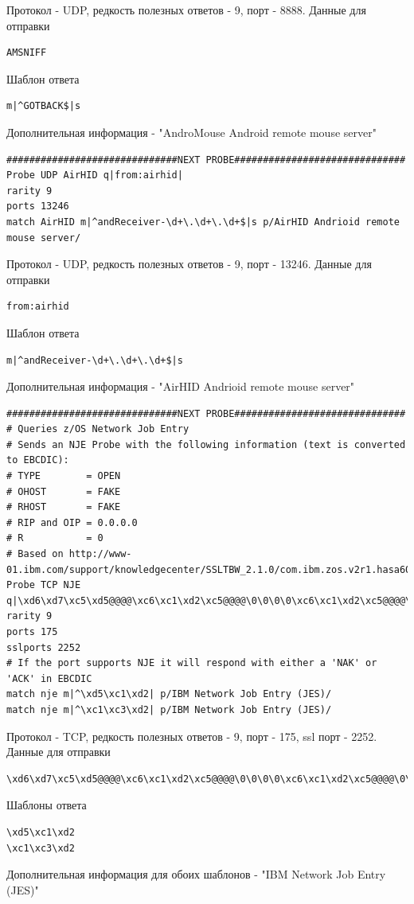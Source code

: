 \documentclass[10pt,a4paper]{report}
\begin{document}
Протокол - UDP, редкость полезных ответов - 9, порт - 8888.
Данные для отправки \begin{verbatim}AMSNIFF\end{verbatim}
Шаблон ответа \begin{verbatim}m|^GOTBACK$|s\end{verbatim}
Дополнительная информация - "AndroMouse Android remote mouse server"

\begin{verbatim}
##############################NEXT PROBE##############################
Probe UDP AirHID q|from:airhid|
rarity 9
ports 13246
match AirHID m|^andReceiver-\d+\.\d+\.\d+$|s p/AirHID Andrioid remote mouse server/
\end{verbatim}

Протокол - UDP, редкость полезных ответов - 9, порт - 13246.
Данные для отправки \begin{verbatim}from:airhid\end{verbatim}
Шаблон ответа \begin{verbatim}m|^andReceiver-\d+\.\d+\.\d+$|s\end{verbatim}
Дополнительная информация - "AirHID Andrioid remote mouse server"

\begin{verbatim}
##############################NEXT PROBE##############################
# Queries z/OS Network Job Entry
# Sends an NJE Probe with the following information (text is converted to EBCDIC):
# TYPE        = OPEN
# OHOST       = FAKE
# RHOST       = FAKE
# RIP and OIP = 0.0.0.0
# R           = 0
# Based on http://www-01.ibm.com/support/knowledgecenter/SSLTBW_2.1.0/com.ibm.zos.v2r1.hasa600/init.htm
Probe TCP NJE q|\xd6\xd7\xc5\xd5@@@@\xc6\xc1\xd2\xc5@@@@\0\0\0\0\xc6\xc1\xd2\xc5@@@@\0\0\0\0\0|
rarity 9
ports 175
sslports 2252
# If the port supports NJE it will respond with either a 'NAK' or 'ACK' in EBCDIC
match nje m|^\xd5\xc1\xd2| p/IBM Network Job Entry (JES)/
match nje m|^\xc1\xc3\xd2| p/IBM Network Job Entry (JES)/
\end{verbatim}

Протокол - TCP, редкость полезных ответов - 9, порт - 175, ssl порт - 2252.
Данные для отправки \begin{verbatim}\xd6\xd7\xc5\xd5@@@@\xc6\xc1\xd2\xc5@@@@\0\0\0\0\xc6\xc1\xd2\xc5@@@@\0\0\0\0\0\end{verbatim}
Шаблоны ответа 
\begin{verbatim}
\xd5\xc1\xd2
\xc1\xc3\xd2
\end{verbatim}
Дополнительная информация для обоих шаблонов - "IBM Network Job Entry (JES)"
\end{document}
